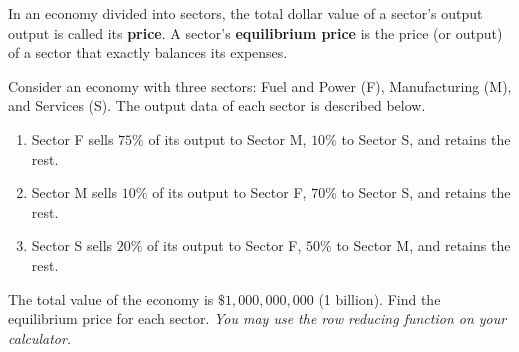 In an economy divided into sectors, the total dollar value of a sector’s output
output is called its \textbf{price}. A sector's \textbf{equilibrium price} is
the price (or output) of a sector that exactly balances its expenses.

\begin{question}
  \label{qst:equilibrium_prices}

  Consider an economy with three sectors: Fuel and Power (F), Manufacturing (M),
  and Services (S). The output data of each sector is described below.
  \begin{enumerate}
    \label{enum:equilibrium_prices_qst}

    \item Sector F sells $75\%$ of its output to Sector M, $10\%$ to Sector S,
      and retains the rest.

    \item  Sector M sells $10\%$ of its output to Sector F, $70\%$ to Sector S,
      and retains the rest.

    \item  Sector S sells $20\%$ of its output to Sector F, $50\%$ to Sector M,
      and retains the rest.
  \end{enumerate}

  The total value of the economy is $\$1,000,000,000$ (1 billion). Find the
  equilibrium price for each sector. \textit{You may use the row reducing
  function on your calculator.}
\end{question}

